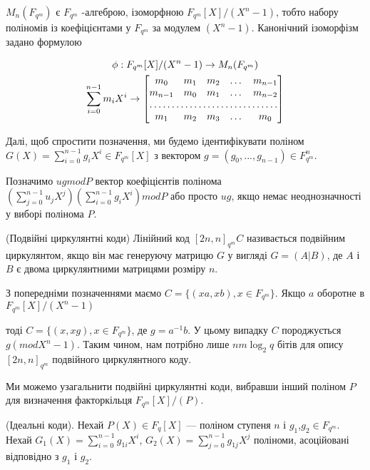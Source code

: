 \begin{claim}
    $M_n(F_{q^m})$ є $F_{q^m}$ -алгеброю, ізоморфною $F_{q^m}[X]/(X^n - 1)$, 
    тобто набору поліномів із коефіцієнтами у $F_{q^m}$ за модулем $(X^n - 1)$. Канонічний ізоморфізм задано формулою

    \begin{gather} 
        \phi : F_{q^m}[X]/(X^n - 1) \rightarrow M_n(F_{q^m}) \\ 
        \sum_{i=0}^{n-1} m_i X^i \rightarrow\begin{bmatrix}
            m_{0}       & m_{1} & m_{2} & \dots & m_{n-1} \\
            m_{n-1}     & m_{0} & m_{1} & \dots & m_{n-2} \\
            \hdotsfor{5} \\
            m_{1}       & m_{2} & m_{3} & \dots & m_{0}
        \end{bmatrix}
    \end{gather} 
\end{claim}

Далі, щоб спростити позначення, ми будемо ідентифікувати поліном 
$G(X) = \sum_{i=0}^{n-1} g_i X^i \in F_{q^m}[X]$ 
з вектором $g = (g_0,...,g_{n-1}) \in F^n_{q^m}$. 

Позначимо $u g mod P$ вектор коефіцієнтів полінома $(\sum_{j=0}^{n-1} u_j X^j )(\sum_{i=0}^{n-1} g_i X^i ) mod P$
або просто $ug$, якщо немає неоднозначності у виборі полінома $P$.

\begin{definition} (Подвійні циркулянтні коди)
    Лінійний код $[2n, n]_{q^m} C$ називається подвійним циркулянтом, 
    якщо він має генеруючу матрицю $G$ у вигляді $G = (A|B)$, де $A$ і $B$ 
    є двома циркулянтними матрицями розміру $n$.
\end{definition}

З попередніми позначеннями маємо $C =\{(xa,xb), x \in F_{q^m}\}$. 
Якщо $a$ оборотне в $F_{q^m}[X]/(X^n - 1)$

тоді $C =\{(x,xg),x \in F_{q^m}\}$, де $g = a^{-1}b$. У цьому випадку $C$ породжується $g ( mod X^n - 1)$. 
Таким чином, нам потрібно лише $nm \log_2 q$ бітів для опису $[2n, n]_{q^m}$ подвійного циркулянтного коду.

Ми можемо узагальнити подвійні циркулянтні коди, вибравши інший поліном $P$ для визначення факторкільця  $F_{q^m}[X]/(P)$.
    

\begin{definition} (Ідеальні коди). Нехай $P(X) \in F_q[X]$ — поліном ступеня $n$ і $g_1$,$g_2 \in F_{q^m}$. 
    Нехай $G_1(X) = \sum_{i=0}^{n-1} g_{1i} X^{i}$,  
    $G_2(X) = \sum_{j=0}^{n-1}  g_{1j} X^{j}$ поліноми, асоційовані відповідно з $g_1$ і $g_2$.
\end{definition}

